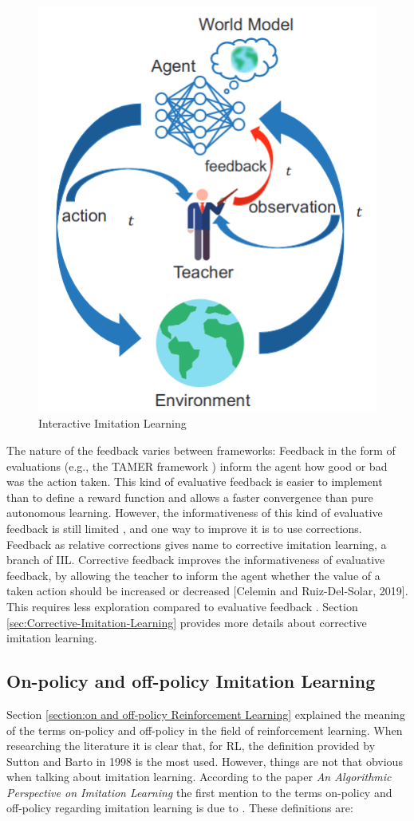 \begin{figure}[H]
    \centering
    \includegraphics[width=.4\textwidth]{Figures/interactive_imitation_learning.png}
    \caption{Interactive Imitation Learning \cite{D-COACH-Dattari-Celemin-Ruiz-del-Solar-Kober:2018}}
    \label{fig:interactive_imitation_learning}
\end{figure}

 The nature of the feedback varies between frameworks: Feedback in the form of evaluations (e.g., the TAMER framework \cite{TAMER-Knox-Stone:2009}) inform the agent how good or bad was the action taken. This kind of evaluative feedback is easier to implement than to define a reward function and allows a faster convergence than pure autonomous learning. 
However, the informativeness of this kind of evaluative feedback is still limited \cite{types-feedback-najar:2020}, and one way to improve it is to use corrections. Feedback as relative corrections \cite{Relative-corrections-Celemin:2019} gives name to corrective imitation learning, a branch of IIL. Corrective feedback improves the informativeness of evaluative feedback, by allowing the teacher to inform the agent whether the value of a taken action should be increased or decreased [Celemin and Ruiz-Del-Solar, 2019]. This requires less exploration compared to evaluative feedback \cite{types-feedback-najar:2020}. Section \ref{sec:Corrective-Imitation-Learning} provides more details about corrective imitation learning.




\subsection{On-policy and off-policy Imitation Learning}
\label{section:on and off-policy Imitation Learning}

Section \ref{section:on and off-policy Reinforcement Learning} explained the meaning of the terms on-policy and off-policy in the field of reinforcement learning. When researching the literature it is clear that, for RL,  the definition provided by Sutton and Barto in 1998 is the most used. However, things are not that obvious when talking about imitation learning. According to the paper \textit{An Algorithmic Perspective on Imitation Learning} \cite{Osa:2018} the first mention to the terms on-policy and off-policy regarding imitation learning is due to \cite{DBLP:journals/corr/LaskeyLHLMFG17}. These definitions are:
\setlength{\parskip}{1em} 

